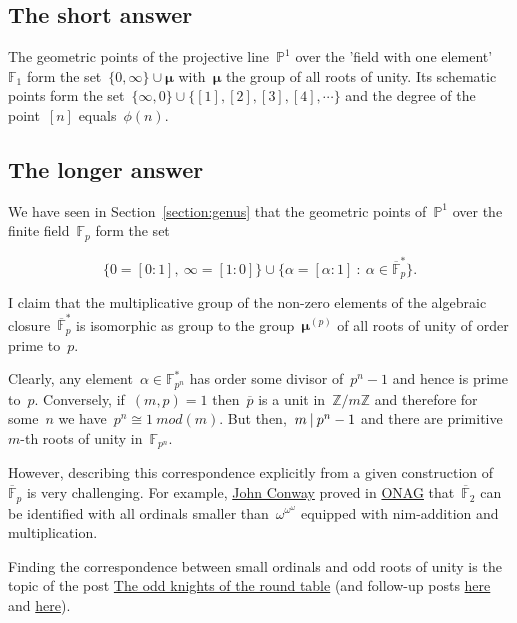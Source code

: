 \label{section:what-is-p1}
\subsection{The short answer}
The geometric points of the projective line~$\mathbb{P}^1$ over the 'field with one element'~$\mathbb{F}_1$ form the set~$\{ 0,\infty \} \cup \pmb{\mu}$ with~$\pmb{\mu}$ the group of all roots of unity. Its schematic points form the set~$\{ \infty,0 \} \cup \{ [1],[2],[3],[4],\cdots \}$ and the degree of the point~$[n]$ equals~$\phi(n)$.

\subsection{The longer answer}
We have seen in Section~\ref{section:genus} that the geometric points of~$\mathbb{P}^1$ over the finite field~$\mathbb{F}_p$ form the set

\begin{equation}
  \{ 0 = [0:1],~\infty=[1:0] \} \cup \{ \alpha = [\alpha:1]~:~\alpha \in \overline{\mathbb{F}}_p^{\ast} \}.
\end{equation}

I claim that the multiplicative group of the non-zero elements of the algebraic closure~$\overline{\mathbb{F}}_p^{\ast}$ is isomorphic as group to the group~$\pmb{\mu}^{(p)}$ of all roots of unity of order prime to~$p$.

Clearly, any element~$\alpha \in \mathbb{F}^{\ast}_{p^n}$   has order some divisor of~$p^n-1$ and hence is prime to~$p$. Conversely, if~$(m,p)=1$ then~$\overline{p}$ is a unit in~$\mathbb{Z}/m\mathbb{Z}$ and therefore for some~$n$ we have~$p^n \cong 1~mod(m)$. But then,~$m\mathbin{|} p^n-1$ and there are primitive~$m$-th roots of unity in~$\mathbb{F}_{p^n}$.

However, describing this correspondence explicitly from a given construction of~$\overline{\mathbb{F}}_p$ is very challenging. For example, \href{http://en.wikipedia.org/wiki/John_Horton_Conway}{John Conway} proved in \href{http://en.wikipedia.org/wiki/On_Numbers_and_Games}{ONAG} that~$\overline{\mathbb{F}}_2$ can be identified with all ordinals smaller than~$\omega^{\omega^{\omega}}$ equipped with nim-addition and multiplication.

Finding the correspondence between small ordinals and odd roots of unity is the topic of the post \href{http://www.neverendingbooks.org/index.php/the-odd-knights-of-the-round-table.html}{The odd knights of the round table} (and follow-up posts \href{http://www.neverendingbooks.org/index.php/seating-the-first-few-thousand-knights.html}{here} and \href{http://www.neverendingbooks.org/index.php/seating-the-first-few-billion-knights.html}{here}).


